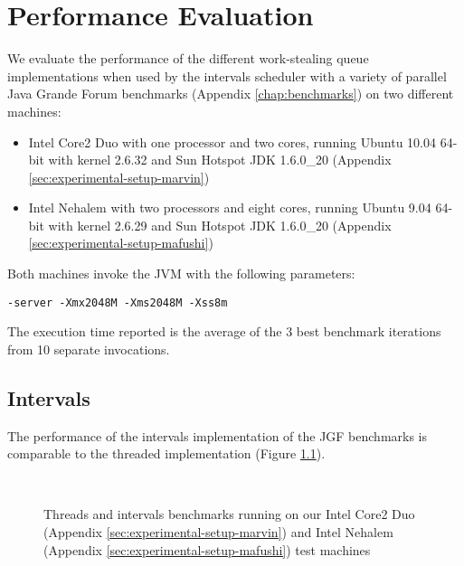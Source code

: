 
\chapter{Performance Evaluation}
\label{chap:queues-performance}

We evaluate the performance of the different work-stealing queue
implementations when used by the intervals scheduler with a variety of
parallel Java Grande Forum benchmarks (Appendix \ref{chap:benchmarks})
on two different machines:

\begin{itemize}
\item Intel Core2 Duo with one processor and two cores, running Ubuntu
  10.04 64-bit with kernel 2.6.32 and Sun Hotspot JDK 1.6.0\_20
  (Appendix \ref{sec:experimental-setup-marvin})
\item Intel Nehalem with two processors and eight cores, running
  Ubuntu 9.04 64-bit with kernel 2.6.29 and Sun Hotspot JDK 1.6.0\_20
  (Appendix \ref{sec:experimental-setup-mafushi})
\end{itemize}

Both machines invoke the JVM with the following parameters:

\begin{lstlisting}[style=Listing]
  -server -Xmx2048M -Xms2048M -Xss8m
\end{lstlisting}

The execution time reported is the average of the 3 best benchmark
iterations from 10 separate invocations.


\section{Intervals}
\label{sec:queues-performance-intervals}

The performance of the intervals implementation of the JGF benchmarks
is comparable to the threaded implementation (Figure
\ref{fig:queues-performance-threads}).

\begin{figure}[!ht]
  \centering
  \\
  \caption[Threads and intervals benchmarks]{Threads and intervals
    benchmarks running on our Intel Core2 Duo (Appendix
    \ref{sec:experimental-setup-marvin}) and Intel Nehalem (Appendix
    \ref{sec:experimental-setup-mafushi}) test machines}
  \label{fig:queues-performance-threads}
\end{figure}

